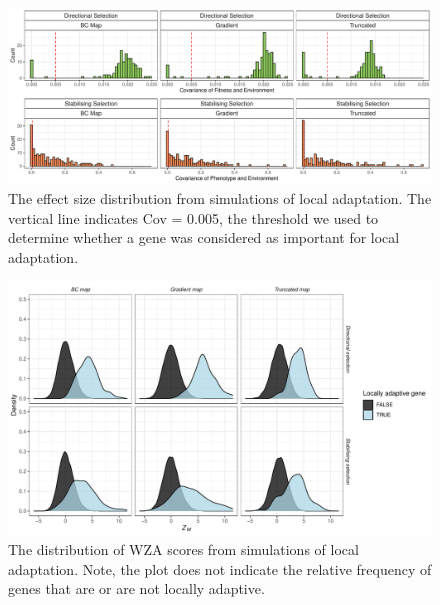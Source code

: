 \documentclass[10pt,twoside,lineno]{GSA_format}
\begin{document}
\pagebreak


\begin{figure}[H]
  \includegraphics[width=\textwidth,height=0.75\textheight,keepaspectratio]{Plots/effectSizeDistributionPlot.pdf}
  \caption{The effect size distribution from simulations of local adaptation. The vertical line indicates Cov = 0.005, the threshold we used to determine whether a gene was considered as important for local adaptation.}

  \label{fig:effectSizeDistribution}
\end{figure}

\pagebreak

\begin{figure}[H]
  \includegraphics[width=\textwidth,height=0.75\textheight,keepaspectratio]{Plots/selectionWZA_plot.pdf}
  \caption{The distribution of WZA scores from simulations of local adaptation. Note, the plot does not indicate the relative frequency of genes that are or are not locally adaptive. }

  \label{fig:ZScoreDistribution}
\end{figure}

\pagebreak
\end{document}
